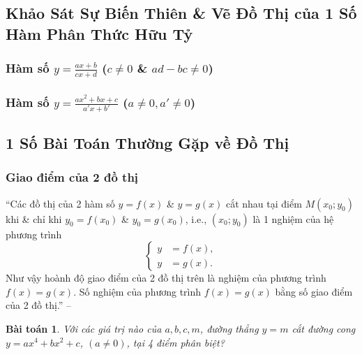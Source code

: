 \documentclass{article}
\numberwithin{equation}{section}
\newtheorem{baitoan}{Bài toán}[section]
\begin{document}
\subsection{Khảo Sát Sự Biến Thiên \& Vẽ Đồ Thị của 1 Số Hàm Phân Thức Hữu Tỷ}

\subsubsection{Hàm số $y = \frac{ax + b}{cx + d}$ ($c\ne 0$ \& $ad - bc\ne 0$)}

\subsubsection{Hàm số $y = \frac{ax^2 + bx + c}{a'x + b'}$ ($a\ne 0,a'\ne 0$)}


\subsection{1 Số Bài Toán Thường Gặp về Đồ Thị}

\subsubsection{Giao điểm của 2 đồ thị}
``Các đồ thị của 2 hàm số $y = f(x)$ \& $y = g(x)$ cắt nhau tại điểm $M(x_0;y_0)$ khi \& chỉ khi $y_0 = f(x_0)$ \& $y_0 = g(x_0)$, i.e., $(x_0;y_0)$ là 1 nghiệm của hệ phương trình
\begin{equation*}
	\left\{\begin{split}
		y &= f(x),\\
		y &= g(x).
	\end{split}\right.
\end{equation*}
Như vậy hoành độ giao điểm của 2 đồ thị trên là nghiệm của phương trình $f(x) = g(x)$. Số nghiệm của phương trình $f(x) = g(x)$ bằng số giao điểm của 2 đồ thị.'' -- \cite[p. 51]{SGK_Toan_12_giai_tich_nang_cao}

\begin{baitoan}
	Với các giá trị nào của $a,b,c,m$, đường thẳng $y = m$ cắt đường cong $y = ax^4 + bx^2 + c$, $(a\ne 0)$, tại 4 điểm phân biệt?
\end{baitoan}
\end{document}
